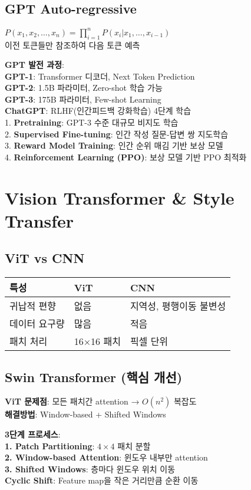 \documentclass[6pt,landscape,a4paper]{article}
\begin{document}
\begin{multicols}{3}
\subsection{GPT Auto-regressive}
$P(x_1,x_2,\ldots,x_n) = \prod_{i=1}^n P(x_i|x_1,\ldots,x_{i-1})$\\
이전 토큰들만 참조하여 다음 토큰 예측

\textbf{GPT 발전 과정}:\\
\textbf{GPT-1}: Transformer 디코더, Next Token Prediction\\
\textbf{GPT-2}: 1.5B 파라미터, Zero-shot 학습 가능\\
\textbf{GPT-3}: 175B 파라미터, Few-shot Learning\\
\textbf{ChatGPT}: RLHF(인간피드백 강화학습) 4단계 학습\\
1. \textbf{Pretraining}: GPT-3 수준 대규모 비지도 학습\\
2. \textbf{Supervised Fine-tuning}: 인간 작성 질문-답변 쌍 지도학습\\
3. \textbf{Reward Model Training}: 인간 순위 매김 기반 보상 모델\\
4. \textbf{Reinforcement Learning (PPO)}: 보상 모델 기반 PPO 최적화
\section{Vision Transformer \& Style Transfer}
\subsection{ViT vs CNN}
\begin{tabular}{|l|l|l|}
\hline
특성 & ViT & CNN \\
\hline
귀납적 편향 & 없음 & 지역성, 평행이동 불변성 \\
데이터 요구량 & 많음 & 적음 \\
패치 처리 & 16×16 패치 & 픽셀 단위 \\
\hline
\end{tabular}
\subsection{Swin Transformer (핵심 개선)}
\textbf{ViT 문제점}: 모든 패치간 attention → $O(n^2)$ 복잡도\\
\textbf{해결방법}: Window-based + Shifted Windows

\textbf{3단계 프로세스}:\\
\textbf{1. Patch Partitioning}: $4 \times 4$ 패치 분할\\
\textbf{2. Window-based Attention}: 윈도우 내부만 attention\\
\textbf{3. Shifted Windows}: 층마다 윈도우 위치 이동\\
\textbf{Cyclic Shift}: Feature map을 작은 거리만큼 순환 이동


\end{multicols}
\end{document}
